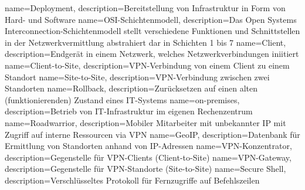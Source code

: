 {
        name=Deployment,
        description={Bereitstellung von Infrastruktur in Form von Hard- und Software}
}
{
        name=OSI-Schichtenmodell,
        description={Das Open Systems Interconnection-Schichtenmodell stellt verschiedene Funktionen und Schnittstellen in der Netzwerkvermittlung abstrahiert dar in Schichten 1 bis 7}
}
{
        name=Client,
        description={Endgerät in einem Netzwerk, welches Netzwerkverbindungen iniitiert}
}
{
        name=Client-to-Site,
        description={VPN-Verbindung von einem Client zu einem Standort}
}
{
        name=Site-to-Site,
        description={VPN-Verbindung zwischen zwei Standorten}
}
{
        name=Rollback,
        description={Zurücksetzen auf einen alten (funktionierenden) Zustand eines IT-Systems}
}
{
        name=on-premises,
        description={Betrieb von IT-Infrastruktur im eigenen Rechenzentrum}
}
{
        name=Roadwarrior,
        description={Mobiler Mitarbeiter mit unbekannter IP mit Zugriff auf interne Ressourcen via VPN}
}
{
        name=GeoIP,
        description={Datenbank für Ermittlung von Standorten anhand von IP-Adressen}
}
{
        name=VPN-Konzentrator,
        description=Gegenstelle für VPN-Clients (Client-to-Site)
}
{
        name=VPN-Gateway,
        description=Gegenstelle für VPN-Standorte (Site-to-Site)
}
{
        name=Secure Shell,
        description=Verschlüsseltes Protokoll für Fernzugriffe auf Befehlszeilen
} 
